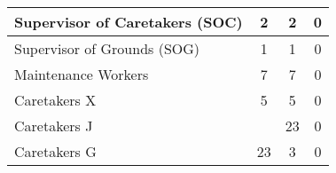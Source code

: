 \begin{tabular}{l|c|c|c|}
        \multicolumn{1}{|l|}{\cellcolor{ccfuschialight}Supervisor of Caretakers (SOC)} & 2                                                      & 2                                                                & 0                                                      \\ \hline
        \multicolumn{1}{|l|}{\cellcolor{ccfuschialight}Supervisor of Grounds (SOG)}    & 1                                                      & 1                                                                & 0                                                      \\ \hline
        \multicolumn{1}{|l|}{\cellcolor{ccfuschialight}Maintenance Workers}            & 7                                                      & 7                                                                & 0                                                       \\ \hline
        \multicolumn{1}{|l|}{\cellcolor{ccfuschialight}Caretakers X}                   & 5                                                      & 5                                                                & 0                                                      \\ \hline
        \multicolumn{1}{|l|}{\cellcolor{ccfuschialight}Caretakers J\tnote{2}}                   &                                                       & 23                                                                & 0                                                        \\ \cline{1-1} \cline{3-4}
        \multicolumn{1}{|l|}{\cellcolor{ccfuschialight}Caretakers G}                   & \multirow{-2}{*}{23}                                                      & 3                                     & 0                            \\ \hline
        \end{tabular}
        
        